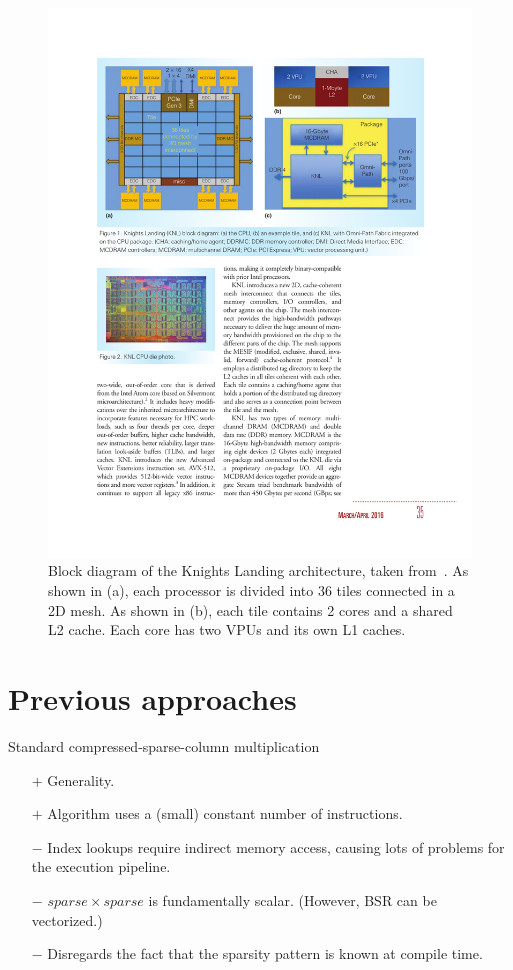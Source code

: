 \begin{figure}[tb]
\centering
\includegraphics[width=\textwidth]{images/knl_arch.pdf}
\caption{Block diagram of the Knights Landing architecture, taken from~\cite{Sodani:2016:KLS:2927511.2927563}. As shown in (a), each processor is divided into 36 tiles connected in a 2D mesh. As shown in (b), each tile contains 2 cores and a shared L2 cache. Each core has two VPUs and its own L1 caches.}
\end{figure}

\section{Previous approaches}

  Standard compressed-sparse-column multiplication
    \begin{itemize}
      \item[$+$] Generality.
      \item[$+$] Algorithm uses a (small) constant number of instructions.
      \item[$-$] Index lookups require indirect memory access, causing lots of problems for the execution pipeline.
      \item[$-$] $sparse \times sparse$ is fundamentally scalar. (However, BSR can be vectorized.)
      \item[$-$] Disregards the fact that the sparsity pattern is known at compile time.
    \end{itemize}

